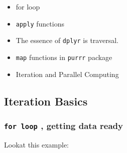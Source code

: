 \documentclass[
]{article}
\begin{document}
\begin{itemize}
\item
  for loop
\item
  \texttt{apply} functions
\item
  The essence of \texttt{dplyr} is traversal.
\item
  \texttt{map} functions in \texttt{purrr} package
\item
  Iteration and Parallel Computing
\end{itemize}

\hypertarget{iteration-basics}{%
\subsection{\texorpdfstring{Iteration Basics
}{Iteration Basics }}\label{iteration-basics}}

\hypertarget{for-loop--getting-data-ready}{%
\subsubsection{\texorpdfstring{\texttt{for\ loop} , getting data
ready}{for loop , getting data ready}}\label{for-loop--getting-data-ready}}

Lookat this example:
\end{document}
